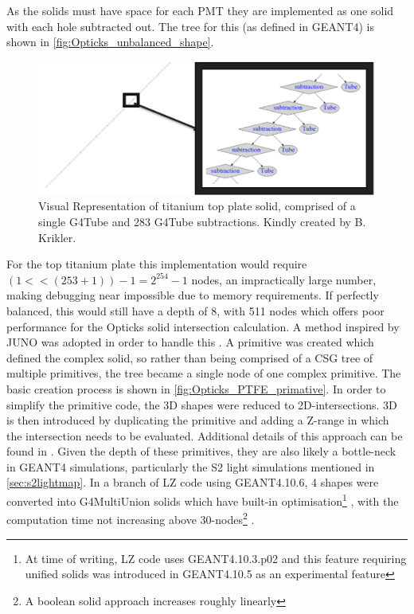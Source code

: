 As the solids must have space for each PMT they are implemented as one solid with each hole subtracted out.
The tree for this (as defined in GEANT4) is shown in \autoref{fig:Opticks_unbalanced_shape}.
\begin{figure}
\includegraphics[width=\textwidth]{Figures/Simulations/unbalanced_ptfe.png}
\centering
\caption{Visual Representation of titanium top plate solid, comprised of a single G4Tube and 283 G4Tube subtractions. Kindly created by B. Krikler.}
\label{fig:Opticks_unbalanced_shape}
\end{figure}
For the top titanium plate this implementation would require $(1 << (253 + 1))-1 = 2^{254} - 1$ nodes, an impractically large number, making debugging near impossible due to memory requirements.
If perfectly balanced, this would still have a depth of 8, with 511 nodes which offers poor performance for the Opticks solid intersection calculation.
A method inspired by JUNO was adopted in order to handle this \cite{Opticks_CHEP_2021_ref}.
A primitive was created which defined the complex solid, so rather than being comprised of a CSG tree of multiple primitives, the tree became a single node of one complex primitive.
The basic creation process is shown in \autoref{fig:Opticks_PTFE_primative}.
In order to simplify the primitive code, the 3D shapes were reduced to 2D-intersections.
3D is then introduced by duplicating the primitive and adding a Z-range in which the intersection needs to be evaluated.
Additional details of this approach can be found in \cite{optix_primitive_code_ref}.
Given the depth of these primitives, they are also likely a bottle-neck in GEANT4 simulations, particularly the S2 light simulations mentioned in \autoref{sec:s2lightmap}.
In a branch of LZ code using GEANT4.10.6, 4 shapes were converted into G4MultiUnion solids which have built-in optimisation\footnote{At time of writing, LZ code uses GEANT4.10.3.p02 and this feature requiring unified solids was introduced in GEANT4.10.5 as an experimental feature} \cite{multiunion_ref}, with the computation time not increasing above 30-nodes\footnote{A boolean solid approach increases roughly linearly} \cite{multiunion_improvement_ref}.
